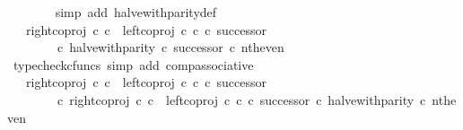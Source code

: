 \begin{isabellebody}
\ \ \ \ \ \ \isamarkupfalse%
\ {\isacharparenleft}{\kern0pt}simp\ add{\isacharcolon}{\kern0pt}\ halve{\isacharunderscore}{\kern0pt}with{\isacharunderscore}{\kern0pt}parity{\isacharunderscore}{\kern0pt}def{}{\isacharparenright}{\kern0pt}\isanewline
\ \ \ \ \isamarkupfalse%
\ \isamarkupfalse%
\ {\isachardoublequoteopen}{\isachardot}{\kern0pt}{\isachardot}{\kern0pt}{\isachardot}{\kern0pt}\ {\isacharequal}{\kern0pt}\ {\isacharparenleft}{\kern0pt}right{\isacharunderscore}{\kern0pt}coproj\ {\isasymnat}\isactrlsub c\ {\isasymnat}\isactrlsub c\ {\isasymamalg}\ {\isacharparenleft}{\kern0pt}left{\isacharunderscore}{\kern0pt}coproj\ {\isasymnat}\isactrlsub c\ {\isasymnat}\isactrlsub c\ {\isasymcirc}\isactrlsub c\ successor{\isacharparenright}{\kern0pt}{\isacharparenright}{\kern0pt}\isanewline
\ \ \ \ \ \ \ \ {\isasymcirc}\isactrlsub c\ {\isacharparenleft}{\kern0pt}halve{\isacharunderscore}{\kern0pt}with{\isacharunderscore}{\kern0pt}parity\ {\isasymcirc}\isactrlsub c\ successor{\isacharparenright}{\kern0pt}\ {\isasymcirc}\isactrlsub c\ nth{\isacharunderscore}{\kern0pt}even{\isachardoublequoteclose}\isanewline
\ \ \ \ \ \ \isamarkupfalse%
\ {\isacharparenleft}{\kern0pt}typecheck{\isacharunderscore}{\kern0pt}cfuncs{\isacharcomma}{\kern0pt}\ simp\ add{\isacharcolon}{\kern0pt}\ comp{\isacharunderscore}{\kern0pt}associative{}{\isacharparenright}{\kern0pt}\isanewline
\ \ \ \ \isamarkupfalse%
\ \isamarkupfalse%
\ {\isachardoublequoteopen}{\isachardot}{\kern0pt}{\isachardot}{\kern0pt}{\isachardot}{\kern0pt}\ {\isacharequal}{\kern0pt}\ {\isacharparenleft}{\kern0pt}right{\isacharunderscore}{\kern0pt}coproj\ {\isasymnat}\isactrlsub c\ {\isasymnat}\isactrlsub c\ {\isasymamalg}\ {\isacharparenleft}{\kern0pt}left{\isacharunderscore}{\kern0pt}coproj\ {\isasymnat}\isactrlsub c\ {\isasymnat}\isactrlsub c\ {\isasymcirc}\isactrlsub c\ successor{\isacharparenright}{\kern0pt}{\isacharparenright}{\kern0pt}\isanewline
\ \ \ \ \ \ \ \ {\isasymcirc}\isactrlsub c\ {\isacharparenleft}{\kern0pt}{\isacharparenleft}{\kern0pt}right{\isacharunderscore}{\kern0pt}coproj\ {\isasymnat}\isactrlsub c\ {\isasymnat}\isactrlsub c\ {\isasymamalg}\ {\isacharparenleft}{\kern0pt}left{\isacharunderscore}{\kern0pt}coproj\ {\isasymnat}\isactrlsub c\ {\isasymnat}\isactrlsub c\ {\isasymcirc}\isactrlsub c\ successor{\isacharparenright}{\kern0pt}{\isacharparenright}{\kern0pt}\ {\isasymcirc}\isactrlsub c\ halve{\isacharunderscore}{\kern0pt}with{\isacharunderscore}{\kern0pt}parity{\isacharparenright}{\kern0pt}\ {\isasymcirc}\isactrlsub c\ nth{\isacharunderscore}{\kern0pt}even{\isachardoublequoteclose}\isanewline

\end{isabellebody}
